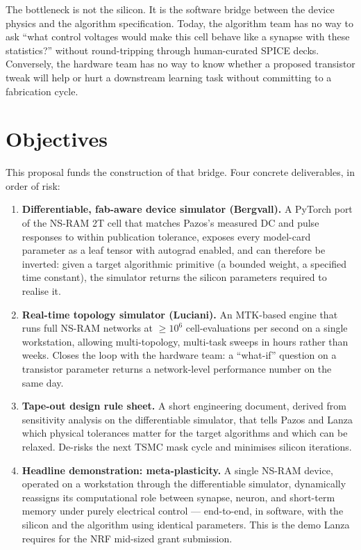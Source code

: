 \documentclass[fontsize=10pt]{article}
\begin{document}
The bottleneck is not the silicon. It is the software bridge between the device physics
and the algorithm specification. Today, the algorithm team has no way to ask
``what control voltages would make this cell behave like a synapse with these statistics?''
without round-tripping through human-curated SPICE decks. Conversely, the hardware team has
no way to know whether a proposed transistor tweak will help or hurt a downstream learning
task without committing to a fabrication cycle.

\section{Objectives}
This proposal funds the construction of that bridge. Four concrete deliverables, in order of
risk:

\begin{enumerate}[leftmargin=1.5em,topsep=0.2em,itemsep=0.2em]
\item \textbf{Differentiable, fab-aware device simulator (Bergvall).} A PyTorch port of the
NS-RAM 2T cell that matches Pazos's measured DC and pulse responses to within publication
tolerance, exposes every model-card parameter as a leaf tensor with autograd enabled, and
can therefore be inverted: given a target algorithmic primitive (a bounded weight, a
specified time constant), the simulator returns the silicon parameters required to realise
it.
\item \textbf{Real-time topology simulator (Luciani).} An MTK-based engine that runs full
NS-RAM networks at $\geq 10^6$ cell-evaluations per second on a single workstation, allowing
multi-topology, multi-task sweeps in hours rather than weeks. Closes the loop with the
hardware team: a ``what-if'' question on a transistor parameter returns a
network-level performance number on the same day.
\item \textbf{Tape-out design rule sheet.} A short engineering document, derived from
sensitivity analysis on the differentiable simulator, that tells Pazos and Lanza which
physical tolerances matter for the target algorithms and which can be relaxed. De-risks
the next TSMC mask cycle and minimises silicon iterations.
\item \textbf{Headline demonstration: meta-plasticity.} A single NS-RAM device, operated
on a workstation through the differentiable simulator, dynamically reassigns its
computational role between synapse, neuron, and short-term memory under purely
electrical control --- end-to-end, in software, with the silicon and the
algorithm using identical parameters. This is the demo Lanza requires for the NRF
mid-sized grant submission.
\end{enumerate}
\end{document}
